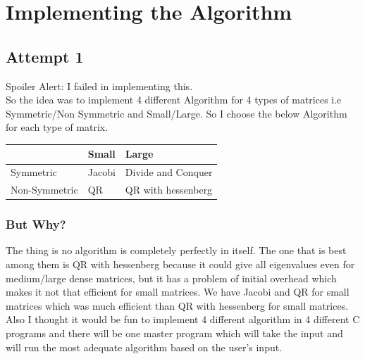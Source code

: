 \documentclass[12pt,oneside,letterpaper,english]{article}
\begin{document}
\section{Implementing the Algorithm}

\subsection{Attempt 1}
\noindent Spoiler Alert: I failed in implementing this. \\
So the idea was to implement 4 different Algorithm for 4 types of matrices i.e Symmetric/Non Symmetric and Small/Large. So I choose the below Algorithm for each type of matrix.
\begin{table}[!ht]
    \centering
    \begin{tabular}{|l|l|l|}
    \hline
        ~ & Small & Large \\ \hline
        Symmetric & Jacobi & Divide and Conquer \\ \hline
        Non-Symmetric & QR & QR with hessenberg \\ \hline
    \end{tabular}
\end{table} 
\subsubsection{But Why?}
\noindent The thing is no algorithm is completely perfectly in itself. The one that is best among them is QR with hessenberg because it could give all eigenvalues even for medium/large dense matrices, but it has a problem of initial overhead which makes it not that efficient for small matrices. We have Jacobi and QR for small matrices which was much efficient than QR with hessenberg for small matrices. Also I thought it would be fun to implement 4 different algorithm in 4 different C programs and there will be one master program which will take the input and will run the most adequate algorithm based on the user's input. 
\end{document}

